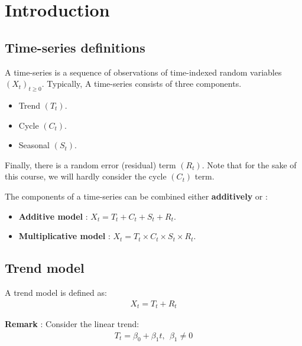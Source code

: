 \section{Introduction}
\subsection{Time-series definitions}
\begin{definition}
    A time-series is a sequence of observations of time-indexed random variables $(X_t)_{t\ge0}$. Typically, A time-series consists of three components.

    \begin{itemize}
        \item Trend $(T_t)$.
        \item Cycle $(C_t)$.
        \item Seasonal $(S_t)$.
    \end{itemize}

    \noindent Finally, there is a random error (residual) term $(R_t)$. Note that for the sake of this course, we will hardly consider the cycle $(C_t)$ term.
\end{definition}

\begin{definition}
    The components of a time-series can be combined either \textbf{additively} or :
    \begin{itemize}
        \item \textbf{Additive model} : $X_t = T_t + C_t + S_t + R_t$.
        \item \textbf{Multiplicative model} : $X_t = T_t\times C_t \times S_t \times R_t$.
    \end{itemize}
\end{definition}

\subsection{Trend model}
\begin{definition}
    A trend model is defined as:
    \begin{align*}
        X_t = T_t + R_t
    \end{align*}
\end{definition}

\textbf{Remark} : Consider the linear trend:
\begin{align*}
    T_t = \beta_0 + \beta_1 t, \ \ \beta_1 \ne 0
\end{align*}

